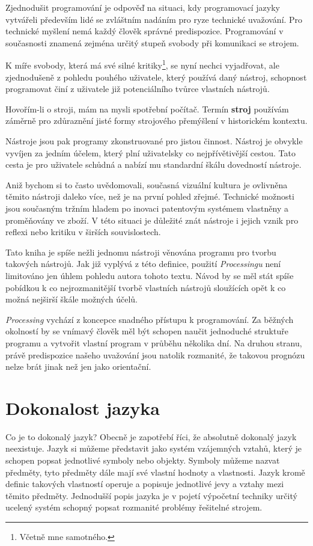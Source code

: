 \documentclass[10pt,twoside=true,open=right,cleardoublepage=empty,chapterprefix=true]{scrbook}
\newcommand{\poznamka}[1]{\footnote{\/ #1}}
\newcommand{\oddil}[1]{\section{#1}\index{#1}\label{#1}}
\newcommand{\slovnik}[1]{\textbf{\gls{#1}}\index{#1}\label{#1}}
\newcommand{\lnb}{\linebreak}
\begin{document}
Zjednodušit programování je odpověď na situaci, kdy programovací jazyky vytvářeli především lidé se zvláštním nadáním pro ryze technické uvažování. Pro technické myšlení nemá každý člověk správné predispozice. Programování v současnosti znamená zejména určitý stupeň svobody při komunikaci se strojem.

K míře svobody, která má své silné kritiky\poznamka{Včetně mne samotného.}, se nyní nechci vyjadřovat, ale zjednodušeně z pohledu pouhého uživatele, který používá daný nástroj, schopnost programovat činí z uživatele již potenciálního tvůrce vlastních nástrojů.

Hovořím-li o stroji, mám na mysli spotřební počítač. Termín \slovnik{stroj} po\-užívám záměrně pro zdůraznění jisté formy strojového přemýšlení v historickém kontextu.

Nástroje jsou pak programy zkonstruované pro jistou činnost. Nástroj je obvykle vyvíjen za jedním účelem, který plní uživatelsky co nejpřívětivější cestou. Tato cesta je pro uživatele schůdná a nabízí mu standardní škálu dovedností nástroje.

Aniž bychom si to často uvědomovali, současná vizuální kultura je ovlivněna těmito nástroji daleko více, než je na první pohled zřejmé. Technické možnosti jsou současným tržním hladem po inovaci patentovým systémem vlastněny a proměňovány ve zboží. V této situaci je důležité znát nástroje i jejich vznik pro reflexi nebo kritiku v širších souvislostech.

Tato kniha je spíše nežli jednomu nástroji věnována programu pro tvorbu takových nástrojů. Jak již vyplývá z této definice, použití {\em Processingu} není limitováno jen úhlem pohledu autora tohoto textu. Návod by se měl stát spíše pobídkou k co nejrozmanitější tvorbě vlastních nástrojů sloužících opět k co možná nejširší škále možných účelů.

{\em Processing} vychází z koncepce snadného přístupu k programování. \lnb Za běžných okolností by se vnímavý člověk měl být schopen naučit jednoduché struktuře programu a vytvořit vlastní program v průběhu několika dní. Na druhou stranu, právě predispozice našeho uvažování jsou \lnb natolik rozmanité, že takovou prognózu nelze brát jinak než jen jako orien\-tační.




\oddil{Dokonalost jazyka}

Co je to dokonalý jazyk? Obecně je zapotřebí říci, že absolutně dokonalý jazyk neexistuje. Jazyk si můžeme představit jako systém vzájemných vztahů, který je schopen popsat jednotlivé symboly nebo objekty. Symboly můžeme nazvat předměty, tyto předměty dále mají své vlastní hodnoty \lnb a vlastnosti. Jazyk kromě definic takových vlastností operuje a popisuje jednotlivé jevy a vztahy mezi těmito předměty. Jednodušší popis jazyka je \lnb v pojetí výpočetní techniky určitý ucelený systém schopný popsat rozmanité problémy řešitelné strojem.
\end{document}
